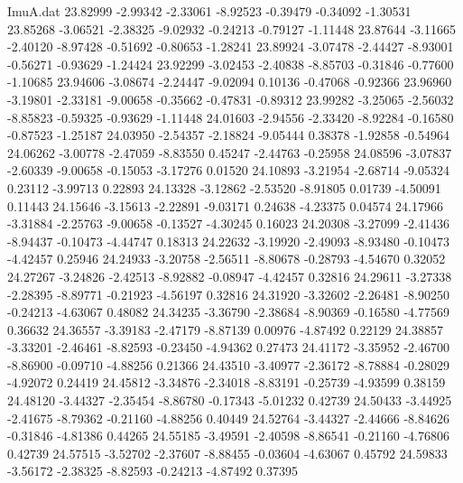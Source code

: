 \begin{filecontents}{ImuA.dat}
  23.82999   -2.99342   -2.33061   -8.92523   -0.39479   -0.34092   -1.30531
  23.85268   -3.06521   -2.38325   -9.02932   -0.24213   -0.79127   -1.11448
  23.87644   -3.11665   -2.40120   -8.97428   -0.51692   -0.80653   -1.28241
  23.89924   -3.07478   -2.44427   -8.93001   -0.56271   -0.93629   -1.24424
  23.92299   -3.02453   -2.40838   -8.85703   -0.31846   -0.77600   -1.10685
  23.94606   -3.08674   -2.24447   -9.02094    0.10136   -0.47068   -0.92366
  23.96960   -3.19801   -2.33181   -9.00658   -0.35662   -0.47831   -0.89312
  23.99282   -3.25065   -2.56032   -8.85823   -0.59325   -0.93629   -1.11448
  24.01603   -2.94556   -2.33420   -8.92284   -0.16580   -0.87523   -1.25187
  24.03950   -2.54357   -2.18824   -9.05444    0.38378   -1.92858   -0.54964
  24.06262   -3.00778   -2.47059   -8.83550    0.45247   -2.44763   -0.25958
  24.08596   -3.07837   -2.60339   -9.00658   -0.15053   -3.17276    0.01520
  24.10893   -3.21954   -2.68714   -9.05324    0.23112   -3.99713    0.22893
  24.13328   -3.12862   -2.53520   -8.91805    0.01739   -4.50091    0.11443
  24.15646   -3.15613   -2.22891   -9.03171    0.24638   -4.23375    0.04574
  24.17966   -3.31884   -2.25763   -9.00658   -0.13527   -4.30245    0.16023
  24.20308   -3.27099   -2.41436   -8.94437   -0.10473   -4.44747    0.18313
  24.22632   -3.19920   -2.49093   -8.93480   -0.10473   -4.42457    0.25946
  24.24933   -3.20758   -2.56511   -8.80678   -0.28793   -4.54670    0.32052
  24.27267   -3.24826   -2.42513   -8.92882   -0.08947   -4.42457    0.32816
  24.29611   -3.27338   -2.28395   -8.89771   -0.21923   -4.56197    0.32816
  24.31920   -3.32602   -2.26481   -8.90250   -0.24213   -4.63067    0.48082
  24.34235   -3.36790   -2.38684   -8.90369   -0.16580   -4.77569    0.36632
  24.36557   -3.39183   -2.47179   -8.87139    0.00976   -4.87492    0.22129
  24.38857   -3.33201   -2.46461   -8.82593   -0.23450   -4.94362    0.27473
  24.41172   -3.35952   -2.46700   -8.86900   -0.09710   -4.88256    0.21366
  24.43510   -3.40977   -2.36172   -8.78884   -0.28029   -4.92072    0.24419
  24.45812   -3.34876   -2.34018   -8.83191   -0.25739   -4.93599    0.38159
  24.48120   -3.44327   -2.35454   -8.86780   -0.17343   -5.01232    0.42739
  24.50433   -3.44925   -2.41675   -8.79362   -0.21160   -4.88256    0.40449
  24.52764   -3.44327   -2.44666   -8.84626   -0.31846   -4.81386    0.44265
  24.55185   -3.49591   -2.40598   -8.86541   -0.21160   -4.76806    0.42739
  24.57515   -3.52702   -2.37607   -8.88455   -0.03604   -4.63067    0.45792
  24.59833   -3.56172   -2.38325   -8.82593   -0.24213   -4.87492    0.37395

\end{filecontents}
